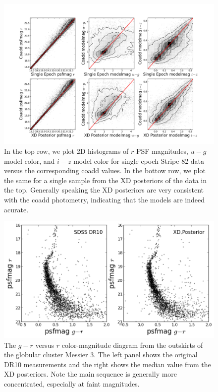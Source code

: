 \documentclass[12pt,preprint]{aastex}
\begin{document}
\begin{figure}
\centering
\includegraphics[clip=true, trim=1.5cm 0.5cm 1.5cm 0.5cm,
  width=16cm]{fig4.png}
\caption{In the top row, we plot 2D histograms of $r$ PSF magnitudes, $u-g$
model color, and $i-z$ model color for single epoch Stripe 82 data versus the
corresponding coadd values.  In the bottow row, we plot the same for a single
sample from the XD posteriors of the data in the top.  Generally speaking the
XD posteriors are very consistent with the coadd photometry, indicating that 
the models are indeed acurate.
}
\label{fig:xx_plots}
\end{figure}

\begin{figure}
\centering
\includegraphics[width=16cm]{fig5.png}
\caption{The $g-r$ versus $r$ color-magnitude diagram from the outskirts of
the globular cluster Messier 3.  The left panel shows the original DR10
measurements and the right shows the median value from the XD posteriors.  Note
the main sequence is generally more concentrated, especially at faint
magnitudes.
}
\label{fig:m3}
\end{figure}
\end{document}
